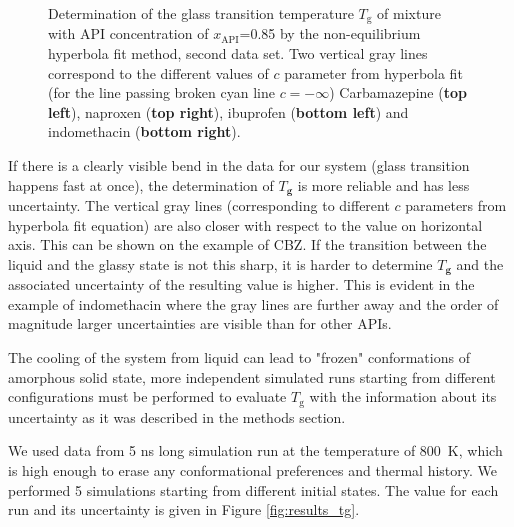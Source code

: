 \begin{figure}[H]
	\vspace{-0.2cm}
	\caption{Determination of the glass transition temperature $T_\text{g}$ of mixture with API concentration of $x_\text{API}$=0.85 by the non-equilibrium hyperbola fit method, second data set. Two vertical gray lines correspond to the different values of $c$ parameter from hyperbola fit (for the line passing broken cyan line $c=-\infty$) Carbamazepine (\textbf{top left}), naproxen (\textbf{top right}), ibuprofen (\textbf{bottom left}) and indomethacin (\textbf{bottom right}).}
	\label{fig:tg_evaluation}    
\end{figure}


If there is a clearly visible bend in the data for our system (glass transition happens fast at once), the determination of $T_\textbf{g}$ is more reliable and has less uncertainty. The vertical gray lines (corresponding to different $c$ parameters from hyperbola fit equation) are also closer with respect to the value on horizontal axis. This can be shown on the example of CBZ. If the transition between the liquid and the glassy state is not this sharp, it is harder to determine $T_\textbf{g}$ and the associated uncertainty of the resulting value is higher. This is evident in the example of indomethacin where the gray lines are further away and the order of magnitude larger uncertainties are visible than for other APIs.

The cooling of the system from liquid can lead to "frozen" conformations of amorphous solid state, more independent simulated runs starting from different configurations must be performed to evaluate $T_\text{g}$ with the information about its uncertainty as it was described in the methods section. 

We used data from 5 ns long simulation run at the temperature of 800~K, which is high enough to erase any conformational preferences and thermal history. We performed 5 simulations starting from different initial states. The value for each run and its uncertainty is given in Figure \ref{fig:results_tg}. 

